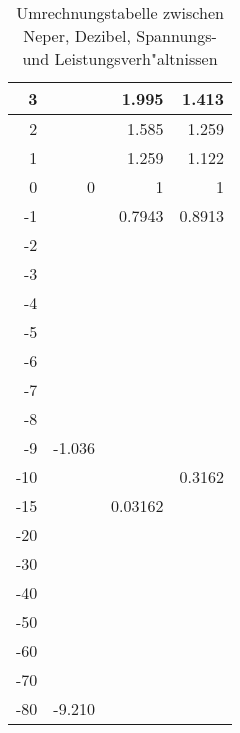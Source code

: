 {\begin{table}[htb!]
\begin{center}
{\begin{tabular}{|r|r|r|r|}
   3 &          & 1.995    & 1.413 \\ \hline
   2 &          & 1.585    & 1.259\\ \hline
   1 &          & 1.259    & 1.122\\ \hline
   0 &  0       & 1        & 1\\ \hline
  -1 &          & 0.7943   & 0.8913  \\ \hline
  -2 &          &   & \\ \hline
  -3 &          & & \\ \hline
  -4 &          & & \\ \hline
  -5 &          & & \\ \hline
  -6 &          & & \\ \hline
  -7 &          & & \\ \hline
  -8 &          & & \\ \hline
  -9 & -1.036   & & \\ \hline
 -10 &          &          & 0.3162 \\ \hline
 -15 &          & 0.03162  & \\ \hline
 -20 &          & & \\ \hline
 -30 &          & & \\ \hline
 -40 &          & & \\ \hline
 -50 &          & & \\ \hline
 -60 &          & & \\ \hline
 -70 & \hspace*{3cm} & & \\ \hline
 -80 & -9.210   & \hspace*{3cm}& \hspace*{3cm}\\ \hline 
 \end{tabular}}
\end{center}\vspace*{-3mm}\caption{Umrechnungstabelle zwischen Neper, Dezibel, Spannungs- und Leistungsverh"altnissen}\label{FREQ_TAB_01}
\end{table}

}
